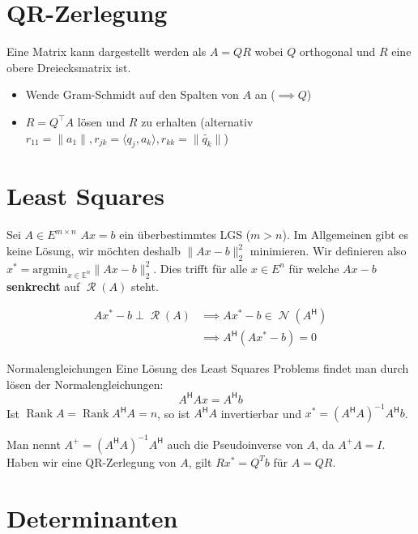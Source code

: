 \documentclass[a4paper,10pt]{article}
\DeclareMathOperator{\Rank}{Rank}
\DeclareMathOperator{\Columnspace}{\mathcal{R}}
\DeclareMathOperator{\Nullspace}{\mathcal{N}}
\newcommand*{\hermconj}{\mathsf{H}}
\def\E{\mathbb{E}}
\begin{document}
\section{QR-Zerlegung}

Eine Matrix kann dargestellt werden als $A = QR$ wobei $Q$ orthogonal und $R$ eine obere Dreiecksmatrix ist.

\begin{itemize}
  \item Wende Gram-Schmidt auf den Spalten von $A$ an ($\implies Q$)
  \item $R = Q^\top A$ lösen und $R$ zu erhalten (alternativ $r_{11} = \lVert a_1 \rVert, r_{jk} = \langle q_j, a_k \rangle, r_{kk} = \lVert \widetilde{q_k} \rVert$)
\end{itemize}

\section{Least Squares}

Sei $A \in E^{m \times n}$ $Ax = b$ ein überbestimmtes LGS ($m > n$). Im Allgemeinen gibt es keine Lösung, wir möchten deshalb $\lVert Ax - b \rVert_2^2$ minimieren. Wir definieren also $x^\ast = \text{argmin}_{x \in \E^n} \lVert Ax - b \rVert_2^2$. Dies trifft für alle $x \in E^n$ für welche $Ax - b$ \textbf{senkrecht} auf $\Columnspace(A)$ steht. 

\begin{align*}
  Ax^\ast - b \perp \Columnspace(A) & \implies Ax^\ast - b \in \Nullspace(A^\hermconj)\\
  & \implies A^\hermconj(Ax^\ast - b) = 0
\end{align*}

\begin{subbox}{Normalengleichungen}
  Eine Lösung des Least Squares Problems findet man durch lösen der Normalengleichungen:
  $$A^\hermconj A x = A^\hermconj b$$
  Ist $\Rank A = \Rank A^\hermconj A = n$, so ist $A^\hermconj A$ invertierbar und $x^\ast = (A^\hermconj A)^{-1} A^\hermconj b$.
\end{subbox}

Man nennt $A^+ = (A^\hermconj A)^{-1} A^\hermconj$ auch die Pseudoinverse von $A$, da $A^+ A = I$. Haben wir eine QR-Zerlegung von $A$, gilt $R x^\ast = Q^T b$ für $A = QR$.

\section{Determinanten}
\end{document}
